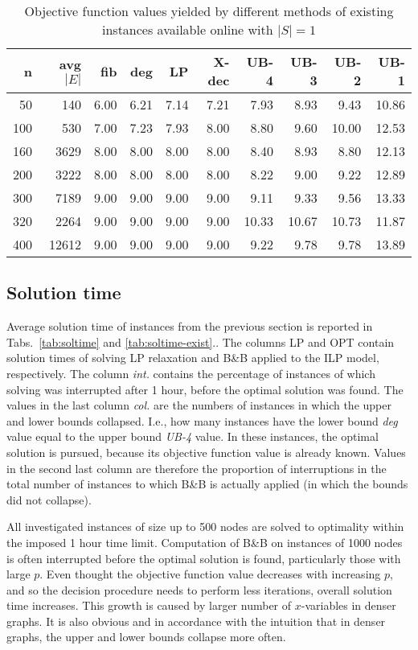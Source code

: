 \begin{table}[]
\centering
\begin{tabular}{rrrrrrrrrr}
n     &	avg $|E|$ & fib  & deg  & LP    & X-dec & UB-4  & UB-3  & UB-2  & UB-1  \\
\hline
  50 & 140  & 6.00 & 6.21 & 7.14 & 7.21 & 7.93 & 8.93  & 9.43  & 10.86 \\
 100 & 530  & 7.00 & 7.23 & 7.93 & 8.00 & 8.80 & 9.60  & 10.00 & 12.53 \\
 160 &3629  & 8.00 & 8.00 & 8.00 & 8.00 & 8.40 & 8.93  & 8.80  & 12.13 \\
 200 &3222  & 8.00 & 8.00 & 8.00 & 8.00 & 8.22 & 9.00  & 9.22  & 12.89 \\
 300 &7189  & 9.00 & 9.00 & 9.00 & 9.00 & 9.11 & 9.33  & 9.56  & 13.33 \\
 320 &2264  & 9.00 & 9.00 & 9.00 & 9.00 &10.33 &10.67  &10.73  & 11.87 \\
 400 &12612 & 9.00 & 9.00 & 9.00 & 9.00 & 9.22 & 9.78  & 9.78  & 13.89 \\
\end{tabular}
\caption{Objective function values yielded by different methods of existing instances available online with $|S|=1$}
\label{tab:obj-exist}
\end{table}


\subsection{Solution time}

Average solution time of instances from the previous section is reported in Tabs.~\ref{tab:soltime} and \ref{tab:soltime-exist}..
The columns LP and OPT contain solution times of solving LP relaxation and B\&B applied to the ILP model, respectively.
The column \emph{int.} contains the percentage of instances of which solving was interrupted after 1 hour, before the optimal solution was found.
The values in the last column \emph{col.} are the numbers of instances in which the upper and lower bounds collapsed. 
I.e., how many instances have the lower bound \emph{deg} value equal to the upper bound \emph{UB-4} value.
In these instances, the optimal solution is pursued, because its objective function value is already known.
Values in the second last column are therefore the proportion of interruptions in the total number of instances to which B\&B is actually applied 
(in which the bounds did not collapse).

All investigated instances of size up to 500 nodes are solved to optimality within the imposed 1 hour time limit.
Computation of B\&B on instances of 1000 nodes is often interrupted before the optimal solution is found, particularly those with large $p$.
Even thought the objective function value decreases with increasing $p$, and so the decision procedure needs to perform less iterations, overall solution time increases.
This growth is caused by larger number of $x$-variables in denser graphs.
It is also obvious and in accordance with the intuition that in denser graphs, the upper and lower bounds collapse more often.

